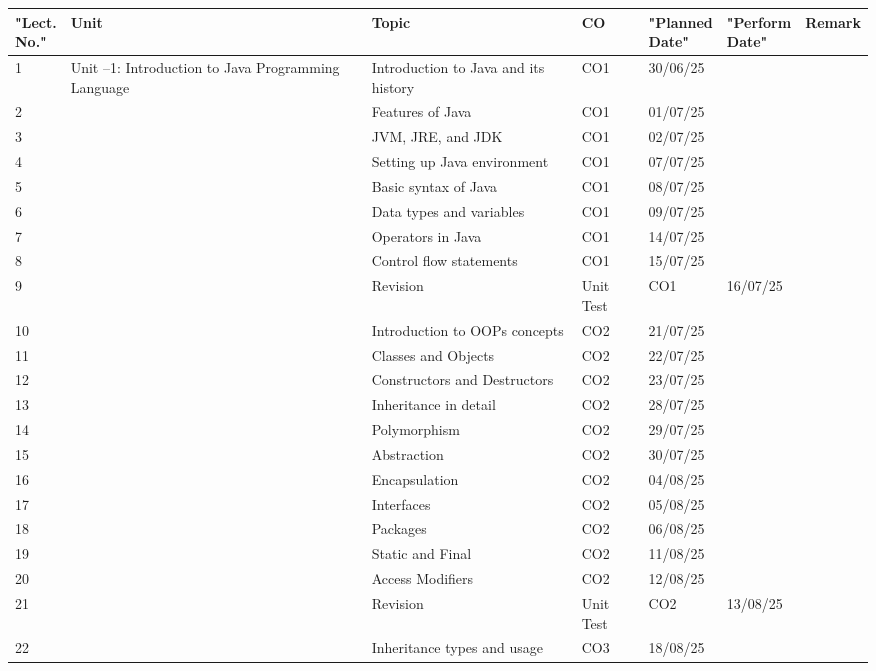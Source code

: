 \documentclass[12pt]{article}
\begin{document}
\begin{longtable}{|p{1cm}|p{3.5cm}|p{6cm}|p{1cm}|p{2cm}|p{2cm}|p{2cm}|}
\hline
\textbf{"Lect.\\No."} & \textbf{Unit} & \textbf{Topic} & \textbf{CO} & \textbf{"Planned\\Date"} & \textbf{"Perform\\Date"} & \textbf{Remark} \\
\hline
\endhead
1 & Unit –1: Introduction to Java Programming Language & Introduction to Java and its history & CO1 & 30/06/25 &  &  \\\hline
2 &  & Features of Java & CO1 & 01/07/25 &  &  \\\hline
3 &  & JVM, JRE, and JDK & CO1 & 02/07/25 &  &  \\\hline
4 &  & Setting up Java environment & CO1 & 07/07/25 &  &  \\\hline
5 &  & Basic syntax of Java & CO1 & 08/07/25 &  &  \\\hline
6 &  & Data types and variables & CO1 & 09/07/25 &  &  \\\hline
7 &  & Operators in Java & CO1 & 14/07/25 &  &  \\\hline
8 &  & Control flow statements & CO1 & 15/07/25 &  &  \\\hline
9 &  & Revision & Unit Test & CO1 & 16/07/25 &  &  \\\hline
10 &  & Introduction to OOPs concepts & CO2 & 21/07/25 &  &  \\\hline
11 &  & Classes and Objects & CO2 & 22/07/25 &  &  \\\hline
12 &  & Constructors and Destructors & CO2 & 23/07/25 &  &  \\\hline
13 &  & Inheritance in detail & CO2 & 28/07/25 &  &  \\\hline
14 &  & Polymorphism & CO2 & 29/07/25 &  &  \\\hline
15 &  & Abstraction & CO2 & 30/07/25 &  &  \\\hline
16 &  & Encapsulation & CO2 & 04/08/25 &  &  \\\hline
17 &  & Interfaces & CO2 & 05/08/25 &  &  \\\hline
18 &  & Packages & CO2 & 06/08/25 &  &  \\\hline
19 &  & Static and Final & CO2 & 11/08/25 &  &  \\\hline
20 &  & Access Modifiers & CO2 & 12/08/25 &  &  \\\hline
21 &  & Revision & Unit Test & CO2 & 13/08/25 &  &  \\\hline
22 &  & Inheritance types and usage & CO3 & 18/08/25 &  &  \\\hline

\end{longtable}
\end{document}
